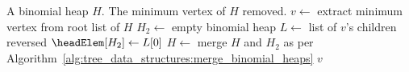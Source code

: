 
\begin{algorithmic}[1]
\Require A binomial heap $H$.
\Ensure The minimum vertex of $H$ removed.
\State $v \gets$ extract minimum vertex from root list of $H$
\State $H_2 \gets$ empty binomial heap
\State $L \gets$ list of $v$'s children reversed
\State $\headElem[H_2] \gets L[0]$
\State $H \gets$ merge $H$ and $H_2$ as per Algorithm~\ref{alg:tree_data_structures:merge_binomial_heaps}
\State \Return $v$
\end{algorithmic}
